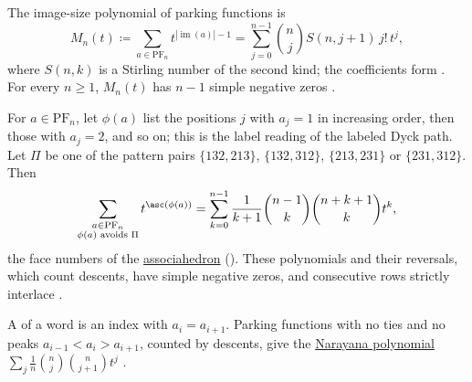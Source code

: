 \begin{example*}
\label{parkingFunctionStatisticsRealRooted}
The image-size polynomial of parking functions is
\[
 M_n(t)\coloneqq\sum_{a\in\mathrm{PF}_n}t^{|\operatorname{im}(a)|-1}
 =\sum_{j=0}^{n-1}\binom{n}{j}S(n,j+1)\,j!\,t^j,
\]
where $S(n,k)$ is a Stirling number of the second kind; the coefficients
form .  For every $n\geq1$, $M_n(t)$ has $n-1$
simple negative zeros \cite[Thm.~9.1]{Alexandersson2026ParkingSmirnov}.

For $a\in\mathrm{PF}_n$, let $\phi(a)$ list the positions $j$ with
$a_j=1$ in increasing order, then those with $a_j=2$, and so on; this is
the label reading of the labeled Dyck path.  Let $\Pi$ be one of the pattern
pairs $\{132,213\}$, $\{132,312\}$, $\{213,231\}$ or $\{231,312\}$.  Then
\[
 \sum_{\substack{a\in\mathrm{PF}_n\\ \phi(a)\text{ avoids }\Pi}}
 t^{\asc(\phi(a))}
 =\sum_{k=0}^{n-1}\frac{1}{k+1}\binom{n-1}{k}\binom{n+k+1}{k}t^k,
\]
the face numbers of the \hyperref[associahedronDefinition]{associahedron}
().  These polynomials and their reversals, which count
descents, have simple negative zeros, and consecutive rows strictly
interlace \cite[Thm.~9.2]{Alexandersson2026ParkingSmirnov}.

A  of a word is an index with $a_i=a_{i+1}$.  Parking functions
with no ties and no peaks $a_{i-1}<a_i>a_{i+1}$, counted by descents, give
the \hyperref[narayanaPolynomialFamiliesRealRooted]{Narayana polynomial}
$\sum_j\frac1n\binom{n}{j}\binom{n}{j+1}t^j$
\cite[Thm.~6.1]{Alexandersson2026ParkingSmirnov}.
\end{example*}


